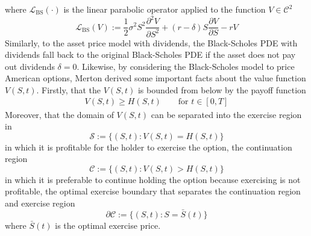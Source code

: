 where $\mathcal{L}_{\text{BS}}(\cdot)$ is the linear parabolic operator applied to the function $V \in \mathcal{C}^2$
\begin{equation}
  \label{eq:blackscholes:preliminaries:linear_parabolic_operator}
  \mathcal{L}_{\text{BS}}(V) := \dfrac{1}{2}\sigma^{2} S^2 \dfrac{\partial^2{V}}{\partial{S^2}} + (r - \delta) S \dfrac{\partial{V}}{\partial{S}} - rV
\end{equation}
Similarly, to the asset price model with dividends, the Black-Scholes PDE with dividends fall back to the original Black-Scholes PDE if the asset does not pay out dividends $\delta = 0$. Likewise, by considering the Black-Scholes model to price American options, Merton\cite{merton_1973} derived some important facts about the value function $V(S,t)$. Firstly, that the $V(S,t)$ is bounded from below by the payoff function
\begin{align}
  \label{eq:blackscholes:american_options_price_lower_bound}
  V(S, t) \ge H(S, t) \qquad \text{for $t \in [0, T]$}
\end{align}
Moreover, that the domain of $V(S, t)$ can be separated into the exercise region in 
\begin{equation}
  \mathcal{S} := \{(S, t) : V(S, t) = H(S, t)\}
  \label{eq:blackscholes:preliminaries:exercise_region}
\end{equation}
in which it is profitable for the holder to exercise the option, the continuation region
\begin{equation}
  \label{eq:blackscholes:preliminaries:continuation_region}
  \mathcal{C} := \{(S, t) : V(S, t) > H(S, t)\}
\end{equation} 
in which it is preferable to continue holding the option because exercising is not profitable, the optimal exercise boundary that separates the continuation region and exercise region
\begin{equation}
  \label{eq:blackscholes:preliminaries:optimal_exercise_boundary}
  \partial \mathcal{C} := \{(S, t) : S = \bar{S}(t)\}
\end{equation}
where $\bar{S}(t)$ is the optimal exercise price. 
